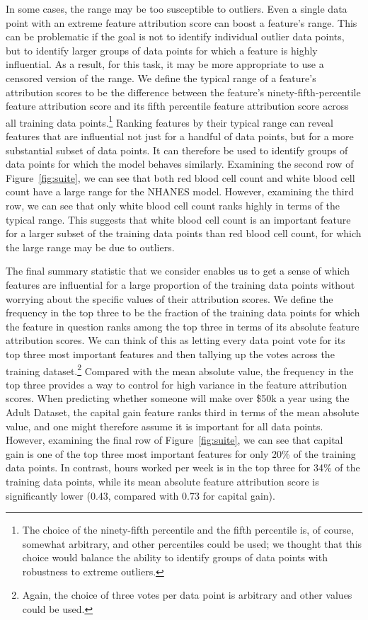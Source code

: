 \documentclass[11pt,dvipdfmx]{article}
\begin{document}
In some cases, the range may be too susceptible to outliers. Even a
single data point with an extreme feature attribution score can boost
a feature's range.  This can be problematic if the goal is not to
identify individual outlier data points, but to identify larger groups
of data points for which a feature is highly influential.  As a
result, for this task, it may be more appropriate to use a censored
version of the range.  We define the typical range of a feature's
attribution scores to be the difference between the feature's
ninety-fifth-percentile feature attribution score and its fifth
percentile feature attribution score across all training data
points.\footnote{The choice of the ninety-fifth percentile and the
  fifth percentile is, of course, somewhat arbitrary, and other
  percentiles could be used; we thought that this choice would balance
  the ability to identify groups of data points with robustness to
  extreme outliers.} Ranking features by their typical range can
reveal features that are influential not just for a handful of data
points, but for a more substantial subset of data points. It can
therefore be used to identify groups of data points for which the
model behaves similarly. Examining the second row of
Figure~\ref{fig:suite}, we can see that both red blood cell count and
white blood cell count have a large range for the NHANES model.
However, examining the third row, we can see that only white blood
cell count ranks highly in terms of the typical range. This suggests
that white blood cell count is an important feature for a larger
subset of the training data points than red blood cell count, for
which the large range may be due to outliers.


The final summary statistic that we consider enables us to get a sense
of which features are influential for a large proportion of the
training data points without worrying about the specific values of
their attribution scores.  We define the frequency in the top three to
be the fraction of the training data points for which the feature in
question ranks among the top three in terms of its absolute feature
attribution scores.  We can think of this as letting every data point
vote for its top three most important features and then tallying up
the votes across the training dataset.\footnote{Again, the choice of
  three votes per data point is arbitrary and other values could be
  used.}  Compared with the mean absolute value, the frequency in the
top three provides a way to control for high variance in the feature
attribution scores.  When predicting whether someone will make over
\$50k a year using the Adult Dataset, the capital gain feature ranks
third in terms of the mean absolute value, and one might therefore
assume it is important for all data points.  However, examining the
final row of Figure~\ref{fig:suite}, we can see that capital gain is
one of the top three most important features for only 20\% of the
training data points. In contrast, hours worked per week is in the top
three for 34\% of the training data points, while its mean absolute
feature attribution score is significantly lower (0.43, compared with
0.73 for capital gain).
\end{document}
